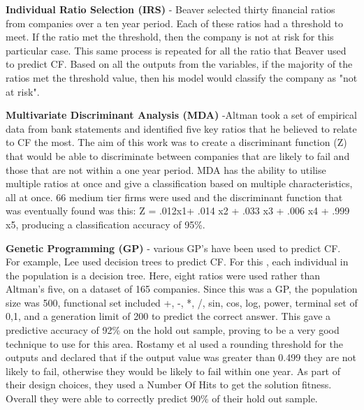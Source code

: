 \documentclass[11pt]{article}
\begin{document}
\textbf{Individual Ratio Selection (IRS)} - Beaver selected thirty financial ratios from companies over a ten year period. Each of these ratios had a threshold to meet. If the ratio met the threshold, then the company is not at risk for this particular case. This same process is repeated for all the ratio that Beaver used to predict CF. Based on all the outputs from the variables, if the majority of the ratios met the threshold value, then his model would classify the company as "not at risk".  


\textbf{Multivariate Discriminant Analysis (MDA)} -Altman took a set of empirical data from bank statements and identified five key ratios that he believed to relate to CF the most. The aim of this work was to create a discriminant function (Z) that would be able to discriminate between companies that are likely to fail and those that are not within a one year period. MDA has the ability to utilise multiple ratios at once and give a classification based on multiple characteristics, all at once. 66 medium tier firms were used and the discriminant function that was eventually found was this:  Z = .012x1+ .014 x2 + .033 x3 + .006 x4 + .999 x5, producing a classification accuracy of 95\%.

\textbf{Genetic Programming (GP)}  - various GP's have been used to predict CF. For example, Lee used decision trees to predict CF. For this , each individual in the population is a decision tree. Here, eight ratios were used rather than Altman's five, on a dataset of 165 companies. Since this was a GP, the population size was 500, functional set included {+, -, *, /, sin, cos, log, power}, terminal set of {0,1}, and a generation limit of 200 to predict the correct answer. This gave a predictive accuracy of 92\% on the hold out sample, proving to be a very good technique to use for this area. Rostamy et al used a rounding threshold for the outputs and declared that if the output value was greater than 0.499 they are not likely to fail, otherwise they would be likely to fail within one year. As part of their design choices, they used a Number Of Hits to get the solution fitness. Overall they were able to correctly predict 90\% of their hold out sample. 
\end{document}
